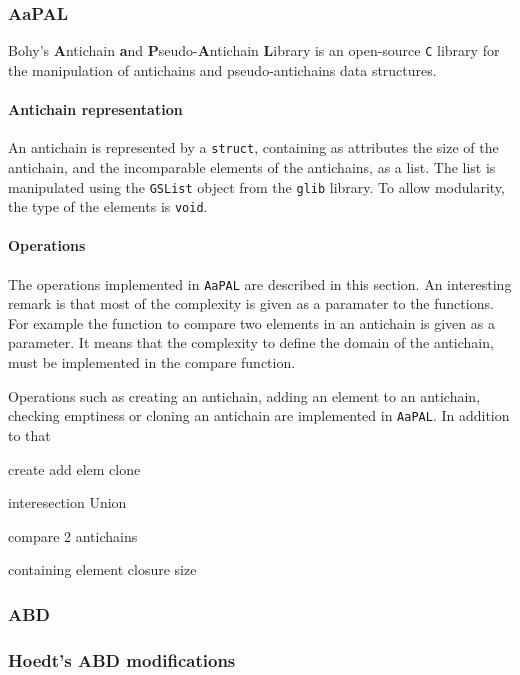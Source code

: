 \documentclass[letterpaper]{article}
\theoremstyle{definition}
\begin{document}
\subsubsection{AaPAL}

Bohy's \textbf{A}ntichain
\textbf{a}nd \textbf{P}seudo-\textbf{A}ntichain \textbf{L}ibrary \cite{aapal}
is an open-source \texttt{C} library for the manipulation
of antichains and pseudo-antichains data structures.


\paragraph{Antichain representation}

An antichain is represented by a \texttt{struct}, containing as attributes
the size of the antichain, and the incomparable elements of the antichains,
as a list. The list is manipulated using the \texttt{GSList} object
from the \texttt{glib} library. To allow modularity, the type of the elements
is \texttt{void}.

\paragraph{Operations}

The operations implemented in \texttt{AaPAL}
are described in this section.
An interesting remark is that most of the complexity is given as a paramater
to the functions. For example the function to compare two elements in
an antichain is given as a parameter. It means that the complexity to define
the domain of the antichain, must be implemented in the compare function.

Operations such as creating an antichain,
adding an element to
an antichain, checking emptiness or cloning an antichain are implemented
in \texttt{AaPAL}. In addition to that

create
add elem
clone

interesection
Union

compare 2 antichains

containing element
closure size



\subsubsection{ABD}

\subsubsection{Hoedt's ABD modifications}
\end{document}
